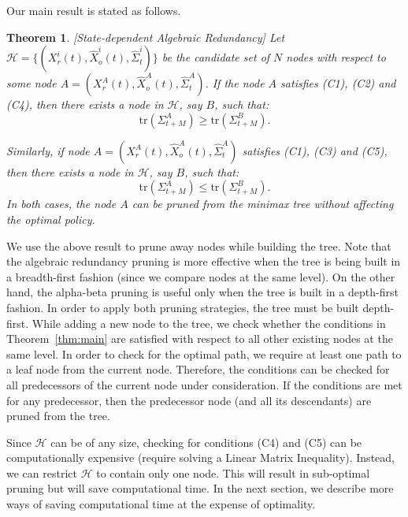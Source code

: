 \documentclass[journal]{IEEEtran}
\newtheorem{theorem}{Theorem}
\begin{document}
Our main result is stated as follows.   
\begin{theorem}\label{StateDependentAR}[State-dependent Algebraic Redundancy]
Let $\mathcal{H} = \{(X^i_r(t),\hat{X}^i_o(t),\hat{\Sigma}^i_t)\}$ be the candidate set of $N$ nodes with respect to some node $A=(X^A_r(t),\hat{X}^A_o(t),\hat{\Sigma}^A_t)$. If the node $A$ satisfies (C1), (C2) and (C4), then there exists a node in $\mathcal{H}$, say $B$, such that:
\begin{equation*}
\text{tr}(\Sigma^A_{t+M}) \ge \text{tr}(\Sigma^B_{t+M}).
\end{equation*}

Similarly, if node $A=(X^A_r(t),\hat{X}^A_o(t),\hat{\Sigma}^A_t)$ satisfies (C1),  (C3) and (C5), then there exists a node in $\mathcal{H}$, say $B$, such that:
\begin{equation*}
\text{tr}(\Sigma^A_{t+M}) \le \text{tr}(\Sigma^B_{t+M}).
\end{equation*}
In both cases, the node $A$ can be pruned from the minimax tree without affecting the optimal policy.
\label{thm:main}
\end{theorem}

We use the above result to prune away nodes while building the tree. Note that the algebraic redundancy pruning is more effective when the tree is being built in a breadth-first fashion (since we compare nodes at the same level). On the other hand, the alpha-beta pruning is useful only when the tree is built in a depth-first fashion. In order to apply both pruning strategies, the tree must be built depth-first. While adding a new node to the tree, we check whether the conditions in Theorem~\ref{thm:main} are satisfied with respect to all other existing nodes at the same level. In order to check for the optimal path, we require at least one path to a leaf node from the current node. Therefore, the conditions can be checked for all predecessors of the current node under consideration. If the conditions are met for any predecessor, then the predecessor node (and all its descendants) are pruned from the tree. 

Since $\mathcal{H}$ can be of any size, checking for conditions (C4) and (C5) can be computationally expensive (require solving a Linear Matrix Inequality). Instead, we can restrict $\mathcal{H}$ to contain only one node. This will result in sub-optimal pruning but will save computational time. In the next section, we describe more ways of saving computational time at the expense of optimality.
\end{document}
